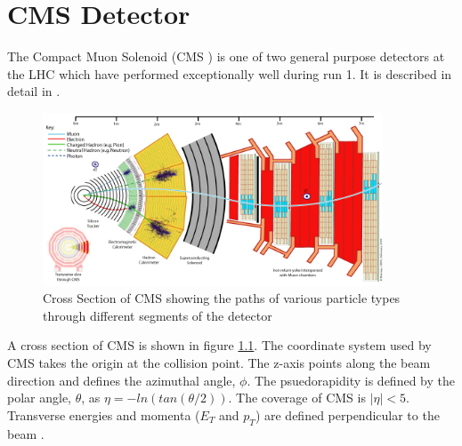 
\chapter{CMS Detector} %

\label{Chapter 2} %


The Compact Muon Solenoid (CMS \cite{CMSTDR}) is one of two general purpose detectors at the LHC which have performed exceptionally well during run 1. It is described in detail in \cite{CMS}. 

\begin{figure}
\centering
    \includegraphics[width=0.9\textwidth]{./Figures/CMS_Slice.jpg}
  \caption{Cross Section of CMS showing the paths of various particle types through different segments of the detector \cite{cmsslice}}
  \label{CMS_SLICE}
\end{figure}

A cross section of CMS is shown in figure \ref{CMS_SLICE}. The coordinate system used by CMS takes the origin at the collision point. The z-axis points along the beam direction and defines the azimuthal angle, $\phi$. The psuedorapidity is defined by the polar angle, $\theta$, as $\eta=-ln(tan(\theta/2))$. The coverage of CMS is $|\eta|<5$. Transverse energies and momenta ($E_T $ and $p_T$)  are defined perpendicular to the beam \cite{cmsiop}. 

